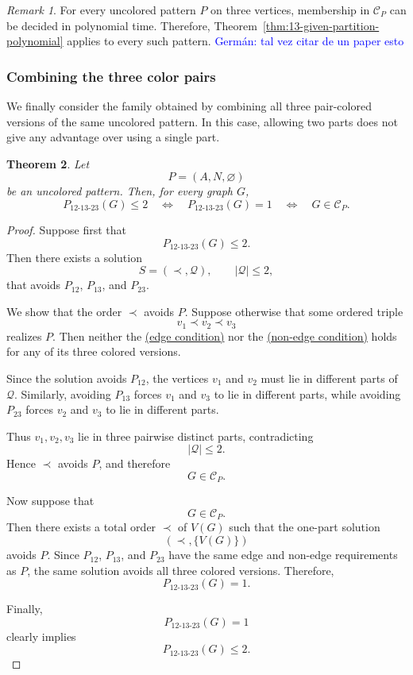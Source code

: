 \documentclass[12pt]{article}
\theoremstyle{plain}
\newtheorem{theorem}{Theorem}[section]
\theoremstyle{definition}
\theoremstyle{remark}
\newtheorem{remark}[theorem]{Remark}
\theoremstyle{definition}
\newcommand{\edgecondition}{%
  \hyperref[def:avoid:cond:edge]{(edge condition)}\xspace
}
\newcommand{\nonedgecondition}{%
  \hyperref[def:avoid:cond:nonedge]{(non-edge condition)}\xspace
}
\newcommand{\german}[1]{%
  \textcolor{blue}{Germán: #1}%
}
\begin{document}
\begin{remark}
For every uncolored pattern \(P\) on three vertices, membership in
\(\mathcal C_P\) can be decided in polynomial time. Therefore,
Theorem~\ref{thm:13-given-partition-polynomial} applies to every such pattern.
\german{tal vez citar de un paper esto}
\end{remark}



\subsubsection{Combining the three color pairs}

We finally consider the family obtained by combining all three pair-colored
versions of the same uncolored pattern. In this case, allowing two parts
does not give any advantage over using a single part.



\begin{theorem}
\label{thm:all-colored-two-iff-base-class}
Let
\[
P=(A,N,\varnothing)
\]
be an uncolored pattern. Then, for every graph \(G\),
\[
P_{12\text{-}13\text{-}23}(G)\le 2
\quad\Longleftrightarrow\quad
P_{12\text{-}13\text{-}23}(G)=1
\quad\Longleftrightarrow\quad
G\in\mathcal C_P.
\]
\end{theorem}

\begin{proof}
Suppose first that
\[
P_{12\text{-}13\text{-}23}(G)\le 2.
\]
Then there exists a solution
\[
S=(\prec,\mathcal Q),
\qquad
|\mathcal Q|\le 2,
\]
that avoids \(P_{12}\), \(P_{13}\), and \(P_{23}\).

We show that the order \(\prec\) avoids \(P\). Suppose otherwise that some
ordered triple
\[
v_1\prec v_2\prec v_3
\]
realizes \(P\). Then neither the \edgecondition{} nor the
\nonedgecondition{} holds for any of its three colored versions.

Since the solution avoids \(P_{12}\), the vertices \(v_1\) and \(v_2\)
must lie in different parts of \(\mathcal Q\). Similarly, avoiding
\(P_{13}\) forces \(v_1\) and \(v_3\) to lie in different parts, while
avoiding \(P_{23}\) forces \(v_2\) and \(v_3\) to lie in different parts.

Thus \(v_1,v_2,v_3\) lie in three pairwise distinct parts, contradicting
\[
|\mathcal Q|\le 2.
\]
Hence \(\prec\) avoids \(P\), and therefore
\[
G\in\mathcal C_P.
\]

Now suppose that
\[
G\in\mathcal C_P.
\]
Then there exists a total order \(\prec\) of \(V(G)\) such that the
one-part solution
\[
(\prec,\{V(G)\})
\]
avoids \(P\). Since \(P_{12}\), \(P_{13}\), and \(P_{23}\) have the same
edge and non-edge requirements as \(P\), the same solution avoids all three
colored versions. Therefore,
\[
P_{12\text{-}13\text{-}23}(G)=1.
\]

Finally,
\[
P_{12\text{-}13\text{-}23}(G)=1
\]
clearly implies
\[
P_{12\text{-}13\text{-}23}(G)\le2.
\]
\end{proof}
\end{document}
